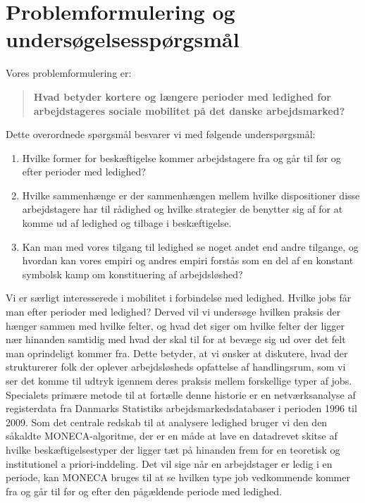

\section{Problemformulering og undersøgelsesspørgsmål \label{}}

Vores problemformulering er:
\begin{quote} %
  \textbf{Hvad betyder kortere og længere perioder med ledighed for arbejdstageres sociale mobilitet på det danske arbejdsmarked?}%
\end{quote}
%
Dette overordnede spørgsmål besvarer vi med følgende underspørgsmål:
%
 \begin{enumerate} [topsep=6pt,itemsep=-1ex]
   \item Hvilke former for beskæftigelse kommer arbejdstagere fra og går til før og efter perioder med ledighed?
   \item Hvilke sammenhænge er der sammenhængen mellem hvilke dispositioner disse arbejdstagere har til rådighed og hvilke strategier de benytter sig af for at komme ud af ledighed og tilbage i beskæftigelse.
   \item Kan man med vores tilgang til ledighed se noget andet end andre tilgange, og hvordan kan vores empiri og andres empiri forstås som en del af en konstant symbolsk kamp om konstituering af arbejdsløshed?
 \end{enumerate}

Vi er særligt interesserede i mobilitet i forbindelse med ledighed. Hvilke jobs får man efter perioder med ledighed? Derved vil vi undersøge hvilken praksis der hænger sammen med hvilke felter, og hvad det siger om hvilke felter der ligger nær hinanden samtidig med hvad der skal til for at bevæge sig ud over det felt man oprindeligt kommer fra. Dette betyder, at vi ønsker at diskutere, hvad der strukturerer folk der oplever arbejdsløsheds opfattelse af handlingsrum, som vi ser det komme til udtryk igennem deres praksis mellem forskellige typer af jobs. Specialets primære metode til at fortælle denne historie er en netværksanalyse af registerdata fra Danmarks Statistiks arbejdsmarkedsdatabaser i perioden 1996 til 2009. Som det centrale redskab til at analysere ledighed bruger vi den den såkaldte MONECA-algoritme, der er en måde at lave en datadrevet skitse af hvilke beskæftigelsestyper der ligger tæt på hinanden frem for en teoretisk og institutionel a priori-inddeling. Det vil sige når en arbejdstager er ledig i en periode, kan MONECA bruges til at se hvilken type job vedkommende kommer fra og går til før og efter den pågældende periode med ledighed.

